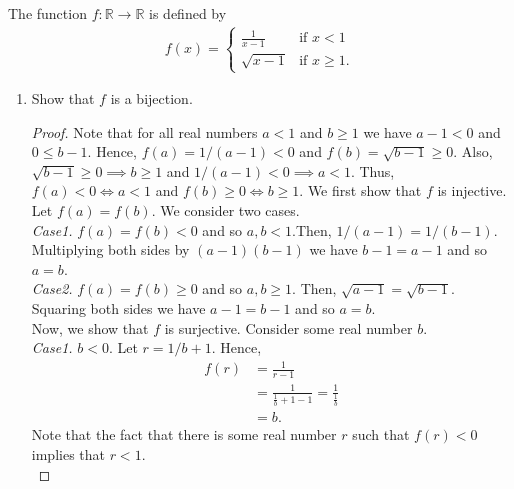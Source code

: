 \documentclass[12pt]{article}
\newcommand{\R}{\mathbb{R}}
\newenvironment{problem}[2][Problem]{\begin{trivlist} \item[\hskip \labelsep {\bfseries #1}\hskip \labelsep {\bfseries #2.}]}{\end{trivlist}}
\begin{document}
    \begin{problem}{57}
      The function $f:\R\to \R$ is defined by
    \begin{align*}
      f(x) =
    \begin{cases}
      \frac{1}{x-1} &\text{if }x<1\\
      \sqrt{x-1} &\text{if }x\geq1.
    \end{cases}
    \end{align*}
    \begin{enumerate}
      \item Show that $f$ is a bijection.
    \begin{proof}
      Note that for all real numbers $a<1$ and $b\geq 1$ we have $a-1<0$ and $0\leq b-1$. Hence, $f(a) = 1/(a-1) < 0$ and $f(b) = \sqrt{b-1}\geq 0$. Also, $\sqrt{b-1} \geq 0 \implies b\geq 1$ and $1/(a-1) <0 \implies a<1$. Thus, $f(a) <0 \iff a<1$ and $f(b) \geq 0 \iff b\geq 1$. We first show that $f$ is injective. Let $f(a)=f(b)$. We consider two cases.\\

      \textit{Case1.} $f(a)=f(b)<0$ and so $a,b<1$.Then, $1/(a-1) = 1/(b-1)$. Multiplying both sides by $(a-1)(b-1)$ we have $b-1=a-1$ and so $a=b$.\\
      \textit{Case2.} $f(a)=f(b) \geq 0$ and so $a,b\geq 1$. Then, $\sqrt{a-1} = \sqrt{b-1}$. Squaring both sides we have $a-1=b-1$ and so $a=b$.\\
      
      Now, we show that $f$ is surjective. Consider some real number $b$.\\
      \textit{Case1.} $b<0$. Let $r=1/b +1$. Hence,  
    \begin{align*}
      f(r) &= \frac{1}{r-1}\\
      &= \frac{1}{\frac{1}{b}+1-1} = \frac{1}{\frac{1}{b}}\\
      &= b.
    \end{align*}
    Note that the fact that there is some real number $r$ such that $f(r)<0$ implies that $r<1$.\\


\end{proof}
\end{enumerate}
\end{problem}
\end{document}
